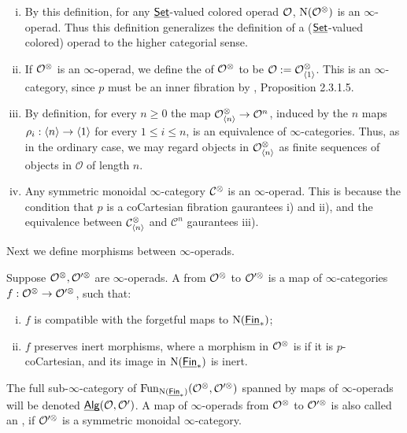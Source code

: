 \documentclass[twoside]{article}
\begin{document}
\begin{remark}
    \begin{enumerate}[i)]
        \item By this definition, for any $\underline{\smash{\mathsf{Set}}}$-valued colored operad $\cal O$,
        $\mathrm{N}(\cal O^\otimes)$ is an $\infty$-operad. Thus this definition
        generalizes the definition of a ($\underline{\smash{\mathsf{Set}}}$-valued colored) operad
        to the higher categorial sense. 

        \item If $\cal O^\otimes$ is an $\infty$-operad, we define the  of $\cal O^\otimes$ to be $\mathcal O:=\mathcal O^\otimes_{\left<1\right>}$. This is an
        $\infty$-category, since $p$ must be an inner fibration by \cite{Lur09},
        Proposition 2.3.1.5.

        \item By definition, for every $n\ge 0$ the map $\mathcal O^\otimes_{\left<n\right>}
        \to\mathcal O^n$, induced by the $n$ maps $\rho_i:\left<n\right>\to\left<1\right>$
        for every $1\le i\le n$, is an equivalence of $\infty$-categories. Thus,
        as in the ordinary case, we may regard objects in $\mathcal O^\otimes_{\left<n\right>}$ as
        finite sequences of objects in $\mathcal O$ of length $n$.

        \item Any symmetric monoidal $\infty$-category $\cal C^\otimes$ is an $\infty$-operad.
        This is because the condition that $p$ is a coCartesian fibration gaurantees
        i) and ii), and the equivalence between $\mathcal C^\otimes_{\left<n\right>}$ and 
        $\mathcal C^n$ gaurantees iii).
    \end{enumerate}
\end{remark}

Next we define morphisms between $\infty$-operads.

\begin{definition}
    Suppose $\cal O^\otimes,O'^\otimes$ are $\infty$-operads. A  from $\cal O^\otimes$ to $\cal O'^\otimes$ is a map
    of $\infty$-categories $f:\cal O^\otimes\to O'^\otimes$, such that:
    \begin{enumerate}[i)]
        \item $f$ is compatible with the forgetful maps to $\mathrm{N}(\underline{\smash{\mathsf{Fin}}}_*)$;
        \item $f$ preserves inert morphisms, where a morphism in $\cal O^\otimes$
        is  if it is $p$-coCartesian, and its image in $\mathrm{N}(\underline{\smash{\mathsf{Fin}}}_*)$
        is inert.
    \end{enumerate}
    The full sub-$\infty$-category of $\operatorname{Fun}_{\mathrm{N}(\underline{\smash{\mathsf{Fin}}}_*)}(\cal O^\otimes,O'^\otimes)$
    spanned by maps of $\infty$-operads will be denoted $\underline{\smash{\mathsf{Alg}}}(\cal O,\cal O')$.
    A map of $\infty$-operads from $\cal O^\otimes$ to $\cal O'^\otimes$ is also called
    an , if $\cal O'^\otimes$
    is a symmetric monoidal $\infty$-category.
\end{definition}
\end{document}
